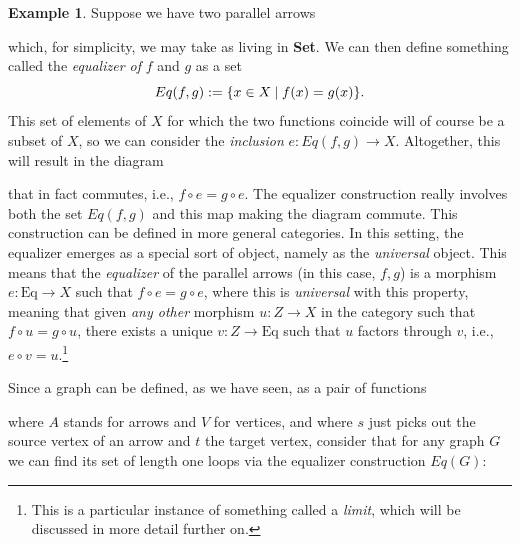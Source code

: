 \documentclass[a4paper]{book}
\theoremstyle{definition}
\newtheorem{example}{Example}[section]
\theoremstyle{definition}
\theoremstyle{definition}
\theoremstyle{theorem}
\theoremstyle{definition}
\begin{document}
\begin{example}
	Suppose we have two parallel arrows 
	\begin{center}
	\end{center}
which, for simplicity, we may take as living in \textbf{Set}. We can then define something called the \textit{equalizer of} $f$ and $g$ as a set
	\begin{equation*}
	Eq(f,g) := \{x \in X \hspace*{0.25em}|\hspace*{0.25em} f(x) = g(x) \}. 
	\end{equation*}
	This set of elements of $X$ for which the two functions coincide will of course be a subset of $X$, so we can consider the \textit{inclusion} $e: Eq(f,g) \rightarrow X$. Altogether, this will result in the diagram
	\begin{center} 
	\end{center} 
that in fact commutes, i.e., $f \circ e = g \circ e$. The equalizer construction really involves both the set $Eq(f,g)$ and this map making the diagram commute. This construction can be defined in more general categories. In this setting, the equalizer emerges as a special sort of object, namely as the \textit{universal} object. This means that the \textit{equalizer} of the parallel arrows (in this case, $f, g$) is a morphism $e: \text{Eq} \rightarrow X$ such that $f \circ e = g \circ e$, where this is \textit{universal} with this property, meaning that given \textit{any other} morphism $u: Z \rightarrow X$ in the category such that $f \circ u = g \circ u$, there exists a unique $v: Z \rightarrow \text{Eq}$ such that $u$ factors through $v$, i.e., $e \circ v = u$.\footnote{This is a particular instance of something called a \textit{limit}, which will be discussed in more detail further on.}\par 
Since a graph can be defined, as we have seen, as a pair of functions  where $A$ stands for arrows and $V$ for vertices, and where $s$ just picks out the source vertex of an arrow and $t$ the target vertex, consider that for any graph $G$ we can find its set of length one loops via the equalizer construction $Eq(G)$:

\end{example}
\end{document}

